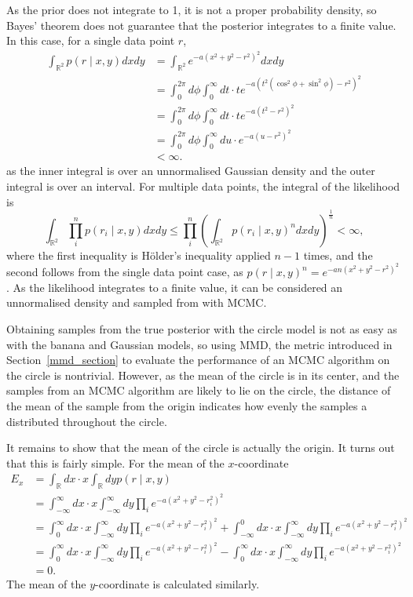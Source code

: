 \documentclass[english,twoside,openright]{HYgraduMLDS}
\newcommand{\R}{\mathbb{R}}
\begin{document}
As the prior does not integrate to 1, it is not a proper probability density,
so Bayes' theorem does not guarantee that the posterior integrates to a finite
value. In this case, for a single data point \(r\),
\begin{align*}
  \int_{\R^{2}}p(r\mid x, y)dxdy
  &= \int_{\R^{2}}e^{-a(x^{2} + y^{2} - r^{2})^{2}}dxdy
  \\&= \int_{0}^{2\pi}d\phi \int_{0}^{\infty}dt
  \cdot te^{-a(t^{2}(\cos^{2} \phi + \sin^{2} \phi) - r^{2})^{2}}
  \\&= \int_{0}^{2\pi}d\phi \int_{0}^{\infty}dt
  \cdot te^{-a(t^{2} - r^{2})^{2}}
  \\&= \int_{0}^{2\pi}d\phi \int_{0}^{\infty}du\cdot e^{-a(u - r^{2})^{2}}
  \\&< \infty.
\end{align*}
as the inner integral is over an unnormalised Gaussian density and
the outer integral is over an interval. For multiple data points, the
integral of the likelihood is
\[
  \int_{\R^{2}}\prod_{i}^{n}p(r_{i}\mid x,y)dxdy
  \leq \prod_{i}^{n}\left(\int_{\R^{2}}p(r_{i}\mid x,y)^{n}dxdy\right)^{\frac{1}{n}}
  < \infty,
\]
where the first inequality is Hölder's inequality applied \(n - 1\) times,
and the second follows from the single data point case, as
\(p(r\mid x,y)^{n} = e^{-an(x^{2} + y^{2} - r^{2})^{2}}\).
As the likelihood integrates to a
finite value, it can be considered an unnormalised density and sampled from
with MCMC.

Obtaining samples from the true posterior with the circle model is not
as easy as with the banana and Gaussian models, so using MMD, the metric
introduced in Section~\ref{mmd_section} to evaluate
the performance of an MCMC algorithm on the circle is nontrivial. However,
as the mean of the circle is in its center, and the samples from an MCMC
algorithm are likely to lie on the circle, the distance of the mean of the
sample from the origin indicates how evenly the samples a distributed throughout
the circle.

It remains to show that the mean of the circle is actually the origin. It turns
out that this is fairly simple. For the mean of the \(x\)-coordinate
\begin{align*}
  E_{x} &= \int_{\R}dx\cdot x\int_{\R} dy p(r\mid x, y)
  \\&= \int_{-\infty}^{\infty}dx\cdot x\int_{-\infty}^{\infty}dy
  \prod_{i} e^{-a(x^{2} + y^{2} - r_{i}^{2})^{2}}
  \\&= \int_{0}^{\infty}dx\cdot x\int_{-\infty}^{\infty}dy
  \prod_{i} e^{-a(x^{2} + y^{2} - r_{i}^{2})^{2}}
  + \int_{-\infty}^{0}dx\cdot x\int_{-\infty}^{\infty}dy
  \prod_{i} e^{-a(x^{2} + y^{2} - r_{i}^{2})^{2}}
  \\&= \int_{0}^{\infty}dx\cdot x\int_{-\infty}^{\infty}dy
  \prod_{i} e^{-a(x^{2} + y^{2} - r_{i}^{2})^{2}}
  - \int_{0}^{\infty}dx\cdot x\int_{-\infty}^{\infty}dy
  \prod_{i} e^{-a(x^{2} + y^{2} - r_{i}^{2})^{2}}
  \\&= 0.
\end{align*}
The mean of the \(y\)-coordinate is calculated similarly.
\end{document}
